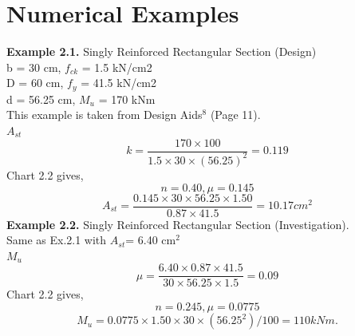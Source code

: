 \section{Numerical Examples}
\textbf{Example 2.1.} Singly Reinforced Rectangular Section (Design)\\
\given 
b = 30 cm, ${f_{ck}}$ = 1.5 kN/cm2\\
 D = 60 cm, ${f_y}$ = 41.5 kN/cm2\\
d = 56.25 cm, ${M_u}$  = 170 kNm\\
This example is taken from Design Aids$^{8}$ (Page 11).\\
\required${A_{st}}$\\
\solution
\begin{equation*}
 k= \frac{170 \times 100}{1.5 \times 30 \times (56.25)^2} =0.119
\label{22}
\end{equation*}
Chart 2.2 gives,
\begin{equation*}
n=0.40, \mu=0.145
\label{22}
\end{equation*}
\begin{equation*}
A_{st}=\frac{0.145 \times 30 \times 56.25 \times 1.50}{0.87 \times 41.5} = 10.17 cm^2
\label{23}
\end{equation*}
\textbf{Example 2.2.} Singly Reinforced Rectangular Section (Investigation).\\
\given Same as Ex.2.1 with ${A_{st}}$= 6.40 cm$^{2}$\\
\required ${M_{u}}$\\
\solution
\begin{equation*}
\mu=\frac{6.40 \times 0.87 \times 41.5}{30 \times 56.25 \times 1.5} =0.09
\label{24}
\end{equation*}
Chart 2.2 gives,
\begin{equation*}
n=0.245, \mu=0.0775
\label{25}
\end{equation*}
\begin{equation*}
M_{u}=0.0775 \times 1.50 \times 30 \times (56.25^2)/100= 110kNm.
\label{26}
\end{equation*}
\newpage
